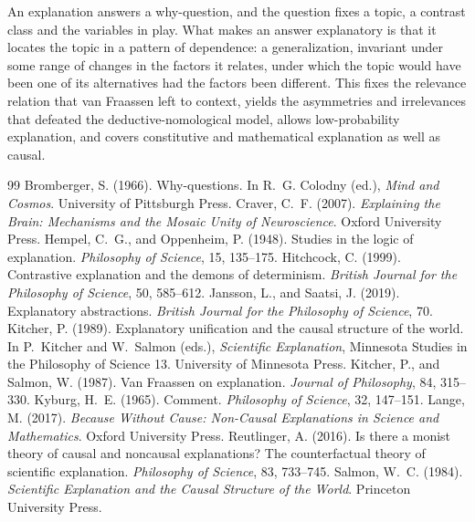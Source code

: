 \documentclass{situationist-preprint}
\begin{document}
An explanation answers a why-question, and the question fixes a topic, a contrast class and the variables in play. What makes an answer explanatory is that it locates the topic in a pattern of dependence: a generalization, invariant under some range of changes in the factors it relates, under which the topic would have been one of its alternatives had the factors been different. This fixes the relevance relation that van Fraassen left to context, yields the asymmetries and irrelevances that defeated the deductive-nomological model, allows low-probability explanation, and covers constitutive and mathematical explanation as well as causal.

\begin{thebibliography}{99}\small
{} Bromberger, S. (1966). Why-questions. In R.~G. Colodny (ed.), \emph{Mind and Cosmos}. University of Pittsburgh Press.
 Craver, C.~F. (2007). \emph{Explaining the Brain: Mechanisms and the Mosaic Unity of Neuroscience}. Oxford University Press.
 Hempel, C.~G., and Oppenheim, P. (1948). Studies in the logic of explanation. \emph{Philosophy of Science}, 15, 135--175.
 Hitchcock, C. (1999). Contrastive explanation and the demons of determinism. \emph{British Journal for the Philosophy of Science}, 50, 585--612.
 Jansson, L., and Saatsi, J. (2019). Explanatory abstractions. \emph{British Journal for the Philosophy of Science}, 70.
 Kitcher, P. (1989). Explanatory unification and the causal structure of the world. In P.~Kitcher and W.~Salmon (eds.), \emph{Scientific Explanation}, Minnesota Studies in the Philosophy of Science 13. University of Minnesota Press.
 Kitcher, P., and Salmon, W. (1987). Van Fraassen on explanation. \emph{Journal of Philosophy}, 84, 315--330.
 Kyburg, H.~E. (1965). Comment. \emph{Philosophy of Science}, 32, 147--151.
 Lange, M. (2017). \emph{Because Without Cause: Non-Causal Explanations in Science and Mathematics}. Oxford University Press.
 Reutlinger, A. (2016). Is there a monist theory of causal and noncausal explanations? The counterfactual theory of scientific explanation. \emph{Philosophy of Science}, 83, 733--745.
 Salmon, W.~C. (1984). \emph{Scientific Explanation and the Causal Structure of the World}. Princeton University Press.

\end{thebibliography}
\end{document}

